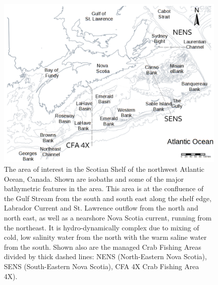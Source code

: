 \documentclass[
	letterpaper, %
	10pt, %
]{article}
\begin{document}
\begin{figure}
	\includegraphics[width=\linewidth]{media/area_map.png}
	\caption{The area of interest in the Scotian Shelf of the
	northwest Atlantic Ocean, Canada. Shown are isobaths
	and some of the major bathymetric features in the area. This area is at
	the confluence of the Gulf Stream from the south and south east along
	the shelf edge, Labrador Current and St. Lawrence outflow from the north
	and north east, as well as a nearshore Nova Scotia current, running from
	the northeast. It is hydro-dynamically complex due to mixing of
	cold, low salinity water from the north with the warm saline water from
	the south. Shown also are the managed Crab Fishing Areas divided
	by thick dashed lines: NENS (North-Eastern Nova Scotia), SENS (South-Eastern Nova Scotia), 
	CFA 4X Crab Fishing Area 4X).}
	\label{fig1}
	\end{figure}   
	
\end{document}
